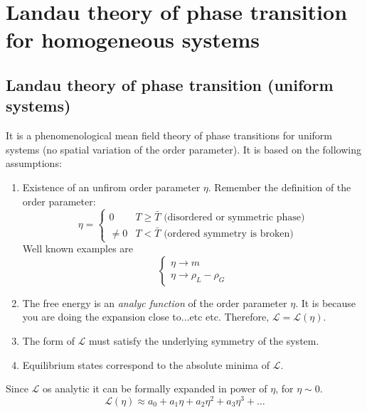 \documentclass[../main/main.tex]{subfiles}
\begin{document}
\chapter{Landau theory of phase transition for homogeneous systems}

\section{Landau theory of phase transition (uniform systems)}

It is a phenomenological mean field theory of phase transitions for uniform systems (no spatial variation of the order parameter). It is based on the following assumptions:
\begin{enumerate}
\item Existence of an unfirom order parameter \( \eta   \). Remember the definition of the order parameter:
\begin{equation}
  \eta   = \begin{cases}
    0 & T \ge \bar{T} \text{ (disordered or symmetric phase)}\\
    \neq 0 & T < \bar{T}  \text{ (ordered symmetry is broken)}
\end{cases}
\end{equation}
Well known examples are
\begin{equation}
  \begin{cases}
   \eta \rightarrow m \\
  \eta  \rightarrow \rho _L - \rho _G
  \end{cases}
\end{equation}
\item The free energy is an \emph{analyc function}  of the order parameter \( \eta   \). It is because you are doing the expansion close to...etc etc. Therefore, \( \mathcal{L} = \mathcal{L} (\eta ) \).
\item The form of \( \mathcal{L} \) must satisfy the underlying symmetry of the system.
\item Equilibrium states correspond to the absolute minima of \( \mathcal{L} \).
\end{enumerate}
\begin{remark}
Since \( \mathcal{L} \) os analytic it can be formally expanded in power of \( \eta  \), for \( \eta \sim 0 \).
\begin{equation}
  \mathcal{L} (\eta ) \approx a_0 + a_1 \eta + a_2 \eta ^2 + a_3 \eta ^3 + \dots
\end{equation}
\end{remark}
\end{document}
